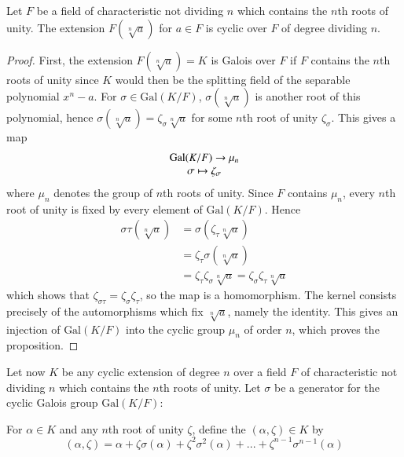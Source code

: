 \begin{proposition}
    Let $F$ be a field of characteristic not dividing $n$ which contains the $n$th roots of unity. The extension $F(\sqrt[n]{a})$ for $a \in F$ is cyclic over $F$ of degree dividing $n$.
\end{proposition}
\begin{proof}
    First, the extension $F(\sqrt[n]{a}) = K$ is Galois over $F$ if $F$ contains the $n$th roots of unity since $K$ would then be the splitting field of the separable polynomial $x^n - a$. For $\sigma \in \text{Gal}(K/F)$, $\sigma(\sqrt[n]{a})$ is another root of this polynomial, hence $\sigma(\sqrt[n]{a}) = \zeta_{\sigma}\sqrt[n]{a}$ for some $n$th root of unity $\zeta_{\sigma}$. This gives a map \begin{equation*}
        \begin{array}{c} \text{Gal}(K/F)\rightarrow \mu_n \\ \sigma\mapsto \zeta_{\sigma} \end{array}
    \end{equation*}
    where $\mu_n$ denotes the group of $n$th roots of unity. Since $F$ contains $\mu_n$, every $n$th root of unity is fixed by every element of $\text{Gal}(K/F)$. Hence \begin{align*}
        \sigma\tau(\sqrt[n]{a}) &= \sigma(\zeta_{\tau}\sqrt[n]{a}) \\
        &= \zeta_{\tau}\sigma(\sqrt[n]{a}) \\
        &= \zeta_{\tau}\zeta_{\sigma}\sqrt[n]{a} = \zeta_{\sigma}\zeta_{\tau}\sqrt[n]{a}
    \end{align*}
    which shows that $\zeta_{\sigma\tau} = \zeta_{\sigma}\zeta_{\tau}$, so the map is a homomorphism. The kernel consists precisely of the automorphisms which fix $\sqrt[n]{a}$, namely the identity. This gives an injection of $\text{Gal}(K/F)$ into the cyclic group $\mu_n$ of order $n$, which proves the proposition.
\end{proof}

Let now $K$ be any cyclic extension of degree $n$ over a field $F$ of characteristic not dividing $n$ which contains the $n$th roots of unity. Let $\sigma$ be a generator for the cyclic Galois group $\text{Gal}(K/F)$:

\begin{definition}
    For $\alpha \in K$ and any $n$th root of unity $\zeta$, define the  $(\alpha,\zeta) \in K$ by \begin{equation*}
        (\alpha,\zeta) = \alpha+\zeta\sigma(\alpha) +\zeta^2\sigma^2(\alpha)+...+\zeta^{n-1}\sigma^{n-1}(\alpha)
    \end{equation*}
\end{definition}

